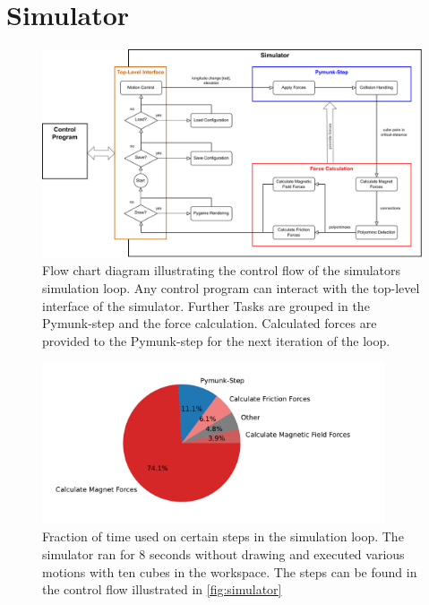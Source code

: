 \chapter{Simulator}
\label{chap:sim}

\begin{figure}
	\centering
	\includegraphics[width=1\textwidth]{figures/simulator_controlflow.pdf}
	\caption[Control flow of the simulator]{Flow chart diagram illustrating the control flow of the simulators simulation loop. Any control program can interact with the top-level interface of the simulator. Further Tasks are grouped in the Pymunk-step and the force calculation. Calculated forces are provided to the Pymunk-step for the next iteration of the loop.}
	\label{fig:simulator}
\end{figure}

\begin{figure}
	\centering
	\includegraphics[width=0.9\textwidth]{figures/plots/simulator_timeuse.pdf}
	\caption[Diagram of time-use for certain steps in simulation loop]{Fraction of time used on certain steps in the simulation loop. The simulator ran for $8$ seconds without drawing and executed various motions with ten cubes in the workspace. The steps can be found in the control flow illustrated in \autoref{fig:simulator}}
	\label{fig:timeuse}
\end{figure}


